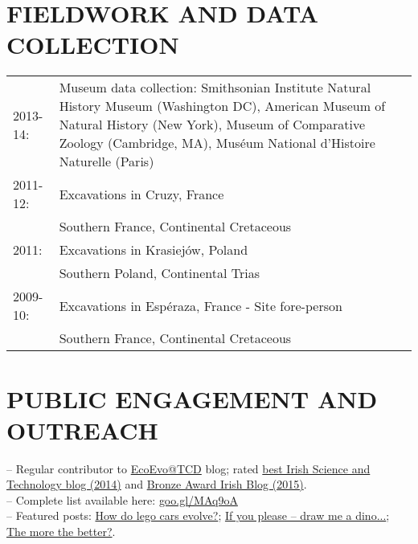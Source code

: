 \documentclass[10pt,a4paper]{article}
\begin{document}
{\section{FIELDWORK AND DATA COLLECTION}
\begin{tabular}{lp{14cm}}
2013-14: & Museum data collection: Smithsonian Institute Natural History Museum (Washington DC), American Museum of Natural History (New York), Museum of Comparative Zoology (Cambridge, MA), Mus\'{e}um National d'Histoire Naturelle (Paris) \\
2011-12: & Excavations in Cruzy, France \\
& Southern France, Continental Cretaceous\\
2011: & Excavations in Krasiej\'{o}w, Poland\\
& Southern Poland, Continental Trias\\
2009-10: & Excavations in Esp\'{e}raza, France - Site fore-person\\
& Southern France, Continental Cretaceous\\
\end{tabular}
\bigskip

\section{PUBLIC ENGAGEMENT AND OUTREACH}
-- Regular contributor to \href{http://www.ecoevoblog.com/}{EcoEvo@TCD} blog; rated \href{http://www.ecoevoblog.com/2014/10/06/blog-awards-winners-2014/}{best Irish Science and Technology blog (2014)} and \href{http://www.blogawardsireland.com/wp-content/uploads/2015/09/Blog-Awards-Ireland-2015-Finalists-Company.pdf}{Bronze Award Irish Blog (2015)}. \\
-- Complete list available here: \href{http://tguillerme.github.io/outreach.html}{goo.gl/MAq9oA}\\
-- Featured posts: \href{http://www.ecoevoblog.com/2013/11/04/how-do-lego-cars-evolve/}{How do lego cars evolve?}; \href{http://www.ecoevoblog.com/2013/06/04/if-you-please-draw-me-a-dino/}{If you please -- draw me a dino...}; \href{http://www.ecoevoblog.com/2015/02/06/the-more-the-better/}{The more the better?}.

}
\end{document}

